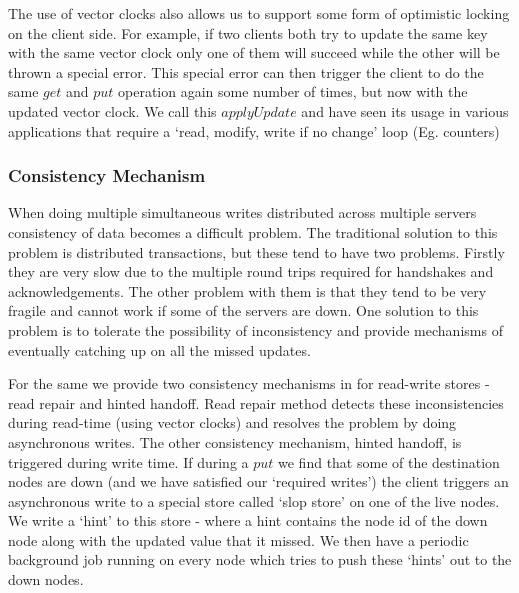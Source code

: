 \documentclass[10pt,twocolumn,preprint,natbib,authoryear]{sigplanconf}
\begin{document}
The use of vector clocks also allows us to support some form of optimistic locking on the client side. For example, if two clients both try to update the same key with the same vector clock only one of them will succeed while the other will be thrown a special error. This special error can then trigger the client to do the same $get$ and $put$ operation again some number of times, but now with the updated vector clock. We call this $applyUpdate$ and have seen its usage in various applications that require a `read, modify, write if no change' loop (Eg. counters)


\subsubsection {Consistency Mechanism }
\label{sec:system_architecture:system_components:consistency_mechanism}

When doing multiple simultaneous writes distributed across multiple servers consistency of data becomes a difficult problem. The traditional solution to this problem is distributed transactions, but these tend to have two problems. Firstly they are very slow due to the multiple round trips required for handshakes and acknowledgements. The other problem with them is that they tend to be very fragile and cannot work if some of the servers are down. One solution to this problem is to tolerate the possibility of inconsistency and provide mechanisms of eventually catching up on all the missed updates. 

For the same we provide two consistency mechanisms in \projectname{} for read-write stores - read repair and hinted handoff. Read repair method detects these inconsistencies during read-time (using vector clocks) and resolves the problem by doing asynchronous writes. The other consistency mechanism, hinted handoff, is triggered during write time. If during a $put$ we find that some of the destination nodes are down (and we have satisfied our `required writes') the client triggers an asynchronous write to a special store called `slop store' on one of the live nodes. We write a `hint' to this store - where a hint contains the node id of the down node along with the updated value that it missed. We then have a periodic background job running on every node which tries to push these `hints' out to the down nodes.
\end{document}

